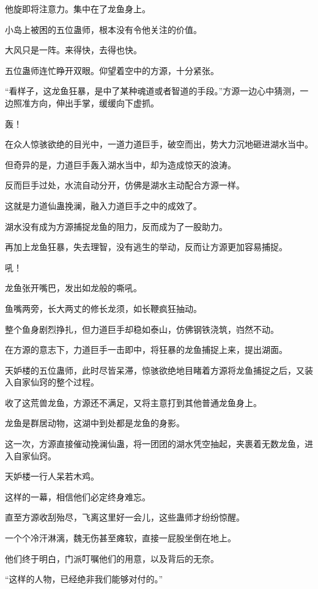 \begin{this_body}
他旋即将注意力。集中在了龙鱼身上。

小岛上被困的五位蛊师，根本没有令他关注的价值。

大风只是一阵。来得快，去得也快。

五位蛊师连忙睁开双眼。仰望着空中的方源，十分紧张。

“看样子，这龙鱼狂暴，是中了某种魂道或者智道的手段。”方源一边心中猜测，一边照准方向，伸出手掌，缓缓向下虚抓。

轰！

在众人惊骇欲绝的目光中，一道力道巨手，破空而出，势大力沉地砸进湖水当中。

但奇异的是，力道巨手轰入湖水当中，却为造成惊天的浪涛。

反而巨手过处，水流自动分开，仿佛是湖水主动配合方源一样。

这就是力道仙蛊挽澜，融入力道巨手之中的成效了。

湖水没有成为方源捕捉龙鱼的阻力，反而成为了一股助力。

再加上龙鱼狂暴，失去理智，没有逃生的举动，反而让方源更加容易捕捉。

吼！

龙鱼张开嘴巴，发出如龙般的嘶吼。

鱼嘴两旁，长大两丈的修长龙须，如长鞭疯狂抽动。

整个鱼身剧烈挣扎，但力道巨手却稳如泰山，仿佛钢铁浇筑，岿然不动。

在方源的意志下，力道巨手一击即中，将狂暴的龙鱼捕捉上来，提出湖面。

天妒楼的五位蛊师，此时尽皆呆滞，惊骇欲绝地目睹着方源将龙鱼捕捉之后，又装入自家仙窍的整个过程。

收了这荒兽龙鱼，方源还不满足，又将主意打到其他普通龙鱼身上。

龙鱼是群居动物，这湖中到处都是龙鱼的身影。

这一次，方源直接催动挽澜仙蛊，将一团团的湖水凭空抽起，夹裹着无数龙鱼，进入自家仙窍。

天妒楼一行人呆若木鸡。

这样的一幕，相信他们必定终身难忘。

直至方源收刮殆尽，飞离这里好一会儿，这些蛊师才纷纷惊醒。

一个个冷汗淋漓，魏无伤甚至瘫软，直接一屁股坐倒在地上。

他们终于明白，门派叮嘱他们的用意，以及背后的无奈。

“这样的人物，已经绝非我们能够对付的。”


\end{this_body}
